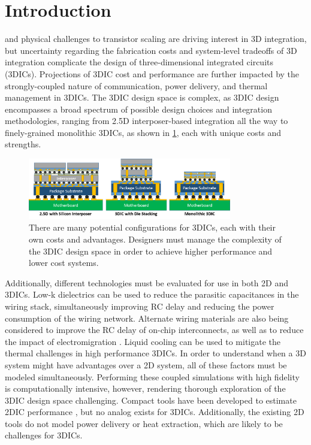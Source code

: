\documentclass[journal,twoside]{IEEEtran}
\newcommand{\changed}[1]{\textcolor{red}{#1}}
\renewcommand{\changed}[1]{#1} %
\begin{document}
\section{Introduction}
 and physical challenges to transistor scaling are driving interest in 3D integration,
but uncertainty regarding the fabrication costs and system-level tradeoffs of 3D integration
complicate the design of three-dimensional integrated circuits (3DICs). Projections of 3DIC cost and performance are further impacted by the strongly-coupled
nature of communication, power delivery, and thermal management in 3DICs. The 3DIC
design space is complex, as 3DIC design encompasses a broad spectrum of possible design choices and integration
methodologies, ranging from 2.5D interposer-based integration all the way to finely-grained monolithic 
3DICs, as shown in \cref{f-3d-spectrum}, each with unique costs and strengths.
\begin{figure}[!tb]
	\centering
	\includegraphics[width=3.5in]{Figures/spectrum_of_3d_4.png}
	\caption{There are many potential configurations for 3DICs, each with their own costs and advantages.
			Designers must manage the complexity of the 3DIC design space in order to achieve higher performance
			and lower cost systems.}
	\label{f-3d-spectrum}
\end{figure}
Additionally, different technologies must be evaluated for use in both 2D and 3DICs.
Low-k dielectrics can be used to reduce the parasitic capacitances in the wiring stack,
simultaneously improving RC delay and reducing the power consumption of the wiring network.
Alternate wiring materials are also being considered to improve the RC delay of on-chip interconnects,
as well as to reduce the impact of electromigration \cite{adelmann_alternative_2014}. 
Liquid cooling can be used to mitigate the thermal challenges
in high performance 3DICs\cite{tuckerman-high-performance-1981,zhang_within-tier_2013}. In order to understand when a 3D system
might have advantages over a 2D system, all of these factors must be modeled simultaneously.
\changed{Performing these coupled simulations with high fidelity is computationally intensive, however, rendering
thorough exploration of the 3DIC design space challenging.}
\changed{Compact tools have been developed to estimate 2DIC performance \cite{venkatesan-optimal-2001,sekar_intsim_2007}, but
no analog exists for 3DICs. Additionally, the existing 2D tools do not model power delivery or heat extraction, 
which are likely to be challenges for 3DICs.}
\end{document}
